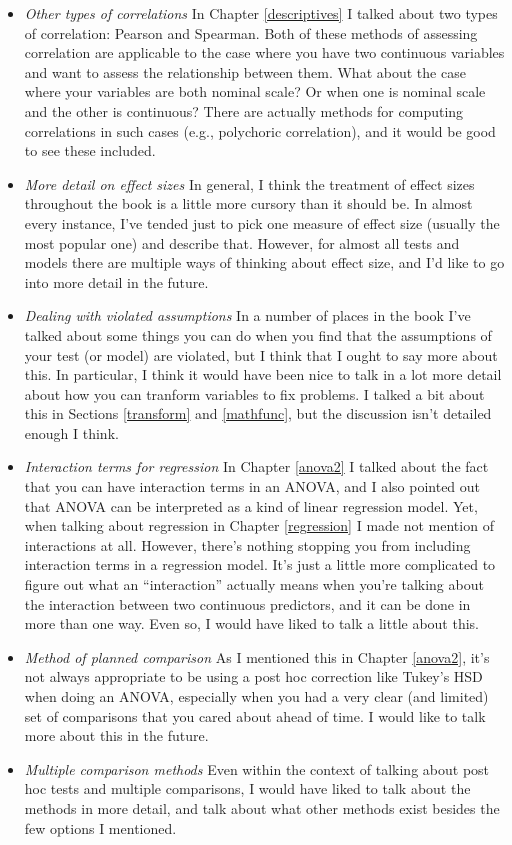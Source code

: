 \documentclass[
]{book}
\providecommand{\tightlist}{%
  \setlength{\itemsep}{0pt}\setlength{\parskip}{0pt}}
\begin{document}
\begin{itemize}
\tightlist
\item
  \emph{Other types of correlations} In Chapter \ref{descriptives} I talked about two types of correlation: Pearson and Spearman. Both of these methods of assessing correlation are applicable to the case where you have two continuous variables and want to assess the relationship between them. What about the case where your variables are both nominal scale? Or when one is nominal scale and the other is continuous? There are actually methods for computing correlations in such cases (e.g., polychoric correlation), and it would be good to see these included.
\item
  \emph{More detail on effect sizes} In general, I think the treatment of effect sizes throughout the book is a little more cursory than it should be. In almost every instance, I've tended just to pick one measure of effect size (usually the most popular one) and describe that. However, for almost all tests and models there are multiple ways of thinking about effect size, and I'd like to go into more detail in the future.
\item
  \emph{Dealing with violated assumptions} In a number of places in the book I've talked about some things you can do when you find that the assumptions of your test (or model) are violated, but I think that I ought to say more about this. In particular, I think it would have been nice to talk in a lot more detail about how you can tranform variables to fix problems. I talked a bit about this in Sections \ref{transform} and \ref{mathfunc}, but the discussion isn't detailed enough I think.
\item
  \emph{Interaction terms for regression} In Chapter \ref{anova2} I talked about the fact that you can have interaction terms in an ANOVA, and I also pointed out that ANOVA can be interpreted as a kind of linear regression model. Yet, when talking about regression in Chapter \ref{regression} I made not mention of interactions at all. However, there's nothing stopping you from including interaction terms in a regression model. It's just a little more complicated to figure out what an ``interaction'' actually means when you're talking about the interaction between two continuous predictors, and it can be done in more than one way. Even so, I would have liked to talk a little about this.
\item
  \emph{Method of planned comparison} As I mentioned this in Chapter \ref{anova2}, it's not always appropriate to be using a post hoc correction like Tukey's HSD when doing an ANOVA, especially when you had a very clear (and limited) set of comparisons that you cared about ahead of time. I would like to talk more about this in the future.
\item
  \emph{Multiple comparison methods} Even within the context of talking about post hoc tests and multiple comparisons, I would have liked to talk about the methods in more detail, and talk about what other methods exist besides the few options I mentioned.
\end{itemize}
\end{document}
